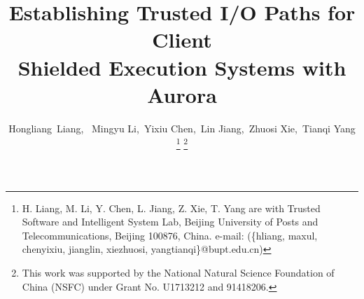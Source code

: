 \documentclass[journal,twocolumn,letterpaper,10pt]{ieee-sty/IEEEtran}
\begin{document}


\title{ Establishing Trusted I/O Paths for Client \\ Shielded Execution Systems with Aurora }

\author{Hongliang~Liang,~
	Mingyu Li,~Yixiu Chen,~Lin Jiang,~Zhuosi Xie,~Tianqi Yang\\
	\thanks{H. Liang, M. Li, Y. Chen, L. Jiang, Z. Xie, T. Yang are with Trusted Software and Intelligent System Lab, Beijing University of Posts and Telecommunications, Beijing 100876, China. e-mail: (\{hliang, maxul, chenyixiu, jianglin, xiezhuosi, yangtianqi\}@bupt.edu.cn) }%
    \thanks{This work was supported by the National Natural Science Foundation of China (NSFC) under Grant No. U1713212 and 91418206.}
}

\maketitle









\end{document}
